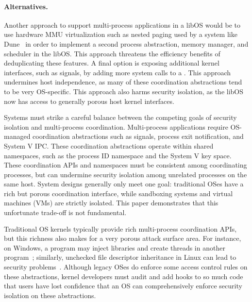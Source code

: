 \paragraph{Alternatives.}
Another approach to support multi-process applications in a libOS 
would be to use hardware MMU virtualization such as nested paging
used by a system like Dune~\citep{belay12dune}
in order to implement a second process abstraction, memory manager, and scheduler in the libOS.
This approach threatens the efficiency benefits of deduplicating these features.
A final option is exposing additional kernel interfaces, such as signals, 
by adding more system calls to a \picoproc{}.
This approach undermines host independence, as many of these coordination abstractions 
tend to be very OS-specific.
This approach also harms security isolation, as the libOS now has access to generally 
porous host kernel interfaces.  


Systems must strike a careful balance between the competing goals of
security isolation and
multi-process coordination.
Multi-process applications require OS-managed coordination abstractions
such as signals, process exit notification, and System V IPC.
These coordination abstractions operate within shared namespaces, such as the 
process ID namespace
and the System V key space.
These coordination APIs and namespaces must be consistent among coordinating processes,
but can %
undermine security isolation among unrelated processes on the same host.
System designs generally only meet one goal: 
traditional OSes have a rich but porous coordination interface, 
while sandboxing systems and virtual machines (VMs) 
are strictly isolated.
This paper demonstrates that this unfortunate trade-off is not
fundamental.


Traditional OS kernels typically provide  rich multi-process coordination 
APIs, but this richness also makes for a very porous attack surface
area.  For instance, on Windows, a program may inject libraries and
create threads in another program~\citep{windows-dll-inject}; 
similarly, unchecked file descriptor inheritance in Linux can lead to
security problems~\citep{close-on-exec}.  
Although legacy OSes do enforce some access control rules on these abstractions,
kernel developers must audit and add hooks to so much code
that
users have lost confidence that an OS can comprehensively enforce 
security isolation on these abstractions.

